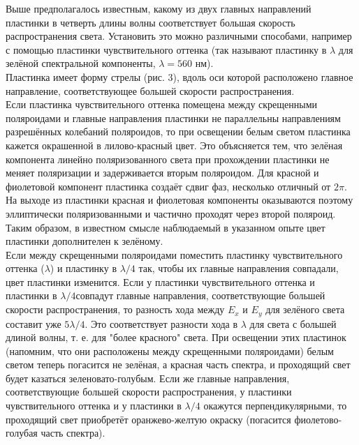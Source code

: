
Выше предполагалось известным, какому из двух главных направлений пластинки в четверть
длины волны соответствует большая скорость распространения света. Установить это можно
различными способами, например с помощью пластинки чувствительного оттенка (так называют
пластинку в $ \lambda $ для зелёной спектральной компоненты, $ \lambda = 560 $ нм). \\

Пластинка имеет форму стрелы (рис. 3), вдоль оси которой расположено главное направление,
соответствующее большей скорости распространения. \\

Если пластинка чувствительного оттенка помещена между скрещенными поляроидами и главные
направления пластинки не параллельны направлениям разрешённых колебаний поляроидов, то при
освещении белым светом пластинка кажется окрашенной в лилово-красный цвет. Это объясняется
тем, что зелёная компонента линейно поляризованного света при прохождении пластинки не
меняет поляризации и задерживается вторым поляроидом. Для красной и фиолетовой компонент
пластинка создаёт сдвиг фаз, несколько отличный от $ 2\pi $. На выходе из пластинки красная
и фиолетовая компоненты оказываются поэтому эллиптически поляризованными и частично
проходят через второй поляроид. Таким образом, в известном смысле наблюдаемый в указанном
опыте цвет пластинки дополнителен к зелёному. \\

Если между скрещенными поляроидами поместить пластинку чувствительного оттенка ($ \lambda $)
и пластинку в $ \lambda/4 $ так, чтобы их главные направления совпадали, цвет пластинки
изменится. Если у пластинки чувствительного оттенка и пластинки в $ \lambda/4  $совпадут
главные направления, соответствующие большей скорости распространения, то разность хода
между $ E_x $ и $ E_y $ для зелёного света составит уже $ 5\lambda/4 $. Это соответствует
разности хода в $ \lambda $ для света с большей длиной волны, т. е. для "более красного"
света. При освещении этих пластинок (напомним, что они расположены между скрещенными
поляроидами) белым светом теперь погасится не зелёная, а красная часть спектра, и проходящий
свет будет казаться зеленовато-голубым. Если же главные направления, соответствующие
большей скорости распространения, у пластинки чувствительного оттенка и у пластинки в
$ \lambda/4 $ окажутся перпендикулярными, то проходящий свет приобретёт оранжево-желтую
окраску (погасится фиолетово-голубая часть спектра). \\

